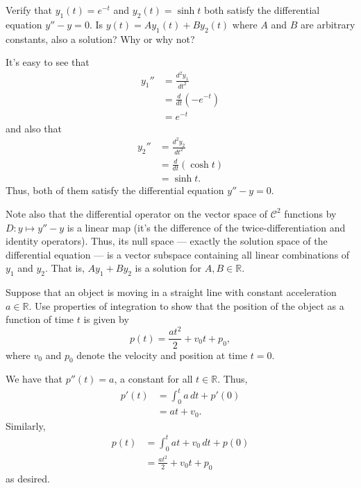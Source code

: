 \documentclass[12 pt, letterpaper]{hmcpset}
\begin{document}
\begin{problem}[1:]
	Verify that $y_{1}(t) = e^{-t}$ and $y_{2}(t) = \sinh{t}$ both satisfy the differential equation $y'' - y = 0$. Is $y(t) = A y_{1}(t) + B y_{2}(t)$ where $A$ and $B$ are arbitrary constants, also a solution? Why or why not?
\end{problem}

\begin{solution}
	It's easy to see that
	\[
		\begin{split}
			y_{1}'' & = \frac{d^{2} y_{1}}{dt^{2}} \\
				& = \frac{d}{dt}(- e^{-t}) \\
				& = e^{-t}
		\end{split}
	\]
	and also that
	\[
		\begin{split}
			y_{2}'' & = \frac{d^{2} y_{2}}{d t^{2}} \\
				& = \frac{d}{dt} (\cosh{t}) \\
				& = \sinh{t}.
		\end{split}
	\]
	Thus, both of them satisfy the differential equation $y'' - y = 0$.

	Note also that the differential operator on the vector space of $\mathcal{C}^{2}$ functions by $D : y \mapsto y'' - y$ is a linear map (it's the difference of the twice-differentiation and identity operators). Thus, its null space --- exactly the solution space of the differential equation --- is a vector subspace containing all linear combinations of $y_{1}$ and $y_{2}$. That is, $A y_{1} + B y_{2}$ is a solution for $A, B \in \mathbb{R}$.
\end{solution}

\pagebreak

\begin{problem}[2:]
	Suppose that an object is moving in a straight line with constant acceleration $a \in \mathbb{R}$. Use properties of integration to show that the position of the object as a function of time $t$ is given by
	\[
		p(t) = \frac{at^{2}}{2} + v_{0} t + p_{0},
	\]
	where $v_{0}$ and $p_{0}$ denote the velocity and position at time $t = 0$.
\end{problem}

\begin{solution}
	We have that $p''(t) = a$, a constant for all $t \in \mathbb{R}$. Thus,
	\[
		\begin{split}
			p'(t) & = \int_{0}^{t} a \, dt + p'(0) \\
			      & = at + v_{0}.
		\end{split}
	\]
	Similarly,
	\[
		\begin{split}
			p(t) & = \int_{0}^{t} at + v_{0} \, dt + p(0) \\
			     & = \frac{at^{2}}{2} + v_{0} t + p_{0}
		\end{split}
	\]
	as desired.
\end{solution}
\end{document}
